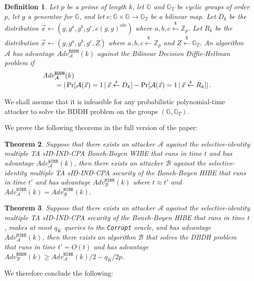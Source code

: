 \documentclass{IEEEtran}
\newcommand{\A}{\mathcal{A}}
\newcommand{\B}{\mathcal{B}}
\newcommand{\Gbb}{\mathbb{G}}
\newcommand{\Zbb}{\mathbb{Z}}
\newcommand{\getsr}{\stackrel{{\scriptscriptstyle\$}}{\gets}}
\newcommand{\adv}[2]{\mathit{Adv}_{#1}^{\texttt{#2}}}
\newtheorem{definition}{Definition}
\newtheorem{theorem}[definition]{Theorem}
\begin{document}
\begin{definition}
Let $p$ be a prime of length $k$, let $\Gbb$ and $\Gbb_{T}$ be
cyclic groups of order $p$, let $g$ a generator for $\Gbb$, and let
$e:\Gbb \times \Gbb \rightarrow \Gbb_{T}$ be a bilinear map. Let
$D_{k}$ be the distribution $\vec{x} \gets
(g,g^{a},g^{b},g^{c},e(g,g)^{abc})$ where $a,b,c \getsr \Zbb_{p}$.
Let $R_{k}$ be the distribution $\vec{x} \gets
(g,g^{a},g^{b},g^{c},Z)$ where $a,b,c \getsr \Zbb_{p}$ and $Z\getsr
\Gbb_{T}$. An algorithm $\A$ has advantage $\adv{\A}{BDDH}(k)$ against the
Bilinear Decision Diffie-Hellman problem if
\begin{displaymath}
\begin{array}{c}
\adv{\A}{BDDH}(k) \hfill \\
\qquad = |\Pr[\A(\vec{x})=1 \,|\, \vec{x} \getsr D_{k}] -
\Pr[\A(\vec{x})=1 \,|\, \vec{x} \getsr R_{k}]| \, .
\end{array}
\end{displaymath}
\end{definition}
We shall assume that it is infeasible for any probabilistic
polynomial-time attacker to solve the BDDH problem on the groups
$(\Gbb,\Gbb_{T})$.\smallskip

We prove the following theorems in the full version of the
paper:\smallskip

\begin{theorem}
Suppose that there exists an attacker $\A$ against the
selective-identity multiple TA sID-IND-CPA Boneh-Boyen WIBE that
runs in time $t$ and has advantage $\adv{\A}{WIBE}(k)$, then there
exists an attacker $\B$ against the selective-identity multiple TA
sID-IND-CPA security of the Boneh-Boyen HIBE that runs in time $t'$
and has advantage $\adv{\B}{HIBE}(k)$ where $t \approx t'$ and
$\adv{\A}{WIBE}(k) = \adv{\B}{HIBE}(k)$.
\end{theorem}
\smallskip

\begin{theorem}
Suppose that there exists an attacker $\A$ against the
selective-identity multiple TA sID-IND-CPA security of the
Boneh-Boyen HIBE that runs in time $t$, makes at most $q_{K}$
queries to the \texttt{Corrupt} oracle, and has advantage
$\adv{\A}{HIBE}(k)$, then there exists an algorithm $\B$ that solves
the DBDH problem that runs in time $t'=O(t)$ and has advantage
$\adv{\B}{BDDH}(k) \geq \adv{\A}{HIBE}(k)/2 -q_{K}/2p$.
\end{theorem}
\smallskip

We therefore conclude the following:\smallskip
\end{document}
